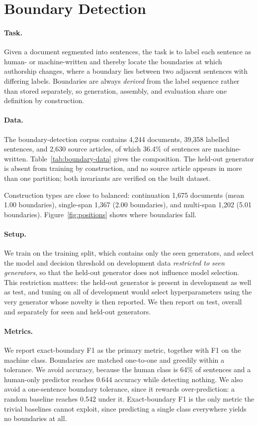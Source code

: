 \documentclass[11pt]{article}
\begin{document}
\section{Boundary Detection}
\label{sec:boundary}

\paragraph{Task.} Given a document segmented into sentences, the task is to label each sentence as human- or machine-written and thereby locate the boundaries at which authorship changes, where a boundary lies between two adjacent sentences with differing labels. Boundaries are always \emph{derived} from the label sequence rather than stored separately, so generation, assembly, and evaluation share one definition by construction.

\paragraph{Data.} The boundary-detection corpus contains 4{,}244 documents, 39{,}358 labelled sentences, and 2{,}630 source articles, of which 36.4\% of sentences are machine-written. Table~\ref{tab:boundary-data} gives the composition. The held-out generator is absent from training by construction, and no source article appears in more than one partition; both invariants are verified on the built dataset.

Construction types are close to balanced: continuation 1{,}675 documents (mean 1.00 boundaries), single-span 1{,}367 (2.00 boundaries), and multi-span 1{,}202 (5.01 boundaries). Figure~\ref{fig:positions} shows where boundaries fall.

\paragraph{Setup.} We train on the training split, which contains only the seen generators, and select the model and decision threshold on development data \emph{restricted to seen generators}, so that the held-out generator does not influence model selection. This restriction matters: the held-out generator is present in development as well as test, and tuning on all of development would select hyperparameters using the very generator whose novelty is then reported. We then report on test, overall and separately for seen and held-out generators.

\paragraph{Metrics.} We report exact-boundary F1 as the primary metric, together with F1 on the machine class. Boundaries are matched one-to-one and greedily within a tolerance. We avoid accuracy, because the human class is 64\% of sentences and a human-only predictor reaches 0.644 accuracy while detecting nothing. We also avoid a one-sentence boundary tolerance, since it rewards over-prediction: a random baseline reaches 0.542 under it. Exact-boundary F1 is the only metric the trivial baselines cannot exploit, since predicting a single class everywhere yields no boundaries at all.
\end{document}
